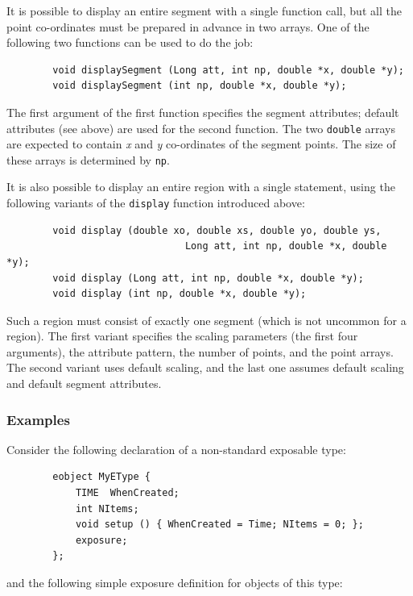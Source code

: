 It is possible to display an entire segment with a single function call, but
all the point co-ordinates must be prepared in advance in two arrays.
One of the following two functions can be used to do the job:
\begin{verbatim}
        void displaySegment (Long att, int np, double *x, double *y);
        void displaySegment (int np, double *x, double *y);
\end{verbatim}

The first argument of the first function specifies the segment attributes;
default attributes (see above) are used for the second function.
The two {\tt double} arrays are expected to contain {\em x\/} and {\em y\/} co-ordinates
of the segment points.
The size of these arrays is determined by {\tt np}.

It is also possible to display an entire region with a single statement,
using the following variants of the {\tt display} function introduced
above:

\begin{verbatim}
        void display (double xo, double xs, double yo, double ys,
                               Long att, int np, double *x, double *y);
        void display (Long att, int np, double *x, double *y);
        void display (int np, double *x, double *y);
\end{verbatim}

Such a region must consist of exactly one segment (which is not uncommon for
a region).
The first variant specifies the scaling parameters (the first four arguments),
the attribute pattern, the number of points, and the point arrays.
The second variant uses default scaling, and the last one assumes default
scaling and default segment attributes.

\subsubsection*{Examples}

\noindent
Consider the following declaration of a non-standard exposable type:

\begin{verbatim}
        eobject MyEType {
            TIME  WhenCreated;
            int NItems;
            void setup () { WhenCreated = Time; NItems = 0; };
            exposure;
        };
\end{verbatim}

\noindent
and the following simple exposure definition for objects of this type:

